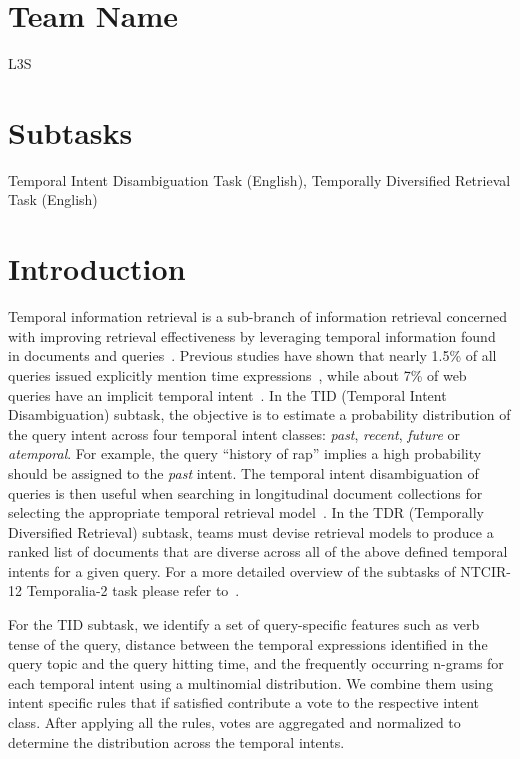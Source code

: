\documentclass{sig-alternate}
\begin{document}
\section*{Team Name}
L3S

\section*{Subtasks}
Temporal Intent Disambiguation Task (English), Temporally Diversified Retrieval Task (English)


\section{Introduction}

Temporal information retrieval is a sub-branch of information retrieval concerned with improving retrieval effectiveness by leveraging temporal information found in documents and queries~\cite{tir,twaw,tir15}. Previous studies have shown that nearly 1.5\% of all queries issued explicitly mention time expressions~\cite{ecir08}, while about 7\% of web queries have an implicit temporal intent~\cite{sigir09}. In the \textsf{TID (Temporal Intent Disambiguation) subtask}, the objective is to estimate a probability distribution of the query intent across four temporal intent classes: \textit{past}, \textit{recent}, \textit{future} or \textit{atemporal}. For example, the query ``history of rap'' implies a high probability should be assigned to the \textit{past} intent. The temporal intent disambiguation of queries is then useful when searching in longitudinal document collections for selecting the appropriate temporal retrieval model~\cite{ecir10,ecdl10,cikm03}. In the \textsf{TDR (Temporally Diversified Retrieval) subtask}, teams must devise retrieval models to produce a ranked list of documents that are diverse across all of the above defined temporal intents for a given query. For a more detailed overview of the subtasks of NTCIR-12 Temporalia-2 task please refer to~\cite{mioverview}.

For the TID subtask, we identify a set of query-specific features such as verb tense of the query, distance between the temporal expressions identified in the query topic and the query hitting time, and the frequently occurring n-grams for each temporal intent using a multinomial distribution. %
 We combine them using intent specific rules that if satisfied contribute a vote to the respective intent class. After applying all the rules, votes are aggregated and normalized to determine the distribution across the temporal intents.
\end{document}
